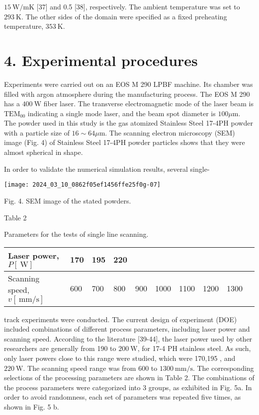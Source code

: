\documentclass[10pt]{article}
\begin{document}
$15 \mathrm{~W} / \mathrm{mK}$ [37] and 0.5 [38], respectively. The ambient temperature was set to $293 \mathrm{~K}$. The other sides of the domain were specified as a fixed preheating temperature, $353 \mathrm{~K}$.

\section*{4. Experimental procedures}
Experiments were carried out on an EOS M 290 LPBF machine. Its chamber was filled with argon atmosphere during the manufacturing process. The EOS M 290 has a $400 \mathrm{~W}$ fiber laser. The transverse electromagnetic mode of the laser beam is $\mathrm{TEM}_{00}$ indicating a single mode laser, and the beam spot diameter is $100 \mu \mathrm{m}$. The powder used in this study is the gas atomized Stainless Steel 17-4PH powder with a particle size of $16 \sim 64 \mu \mathrm{m}$. The scanning electron microscopy (SEM) image (Fig. 4) of Stainless Steel 17-4PH powder particles shows that they were almost spherical in shape.

In order to validate the numerical simulation results, several single-

\begin{center}
\texttt{[image: 2024\_03\_10\_0862f05ef1456ffe25f0g-07]}
\end{center}

Fig. 4. SEM image of the stated powders.

Table 2

Parameters for the tests of single line scanning.

\begin{center}
\begin{tabular}{llllllllll}
\hline
Laser power, $P[\mathrm{~W}]$ & 170 & 195 & 220 &  &  &  &  &  \\
\hline
Scanning speed, $v[\mathrm{~mm} / \mathrm{s}]$ & 600 & 700 & 800 & 900 & 1000 & 1100 & 1200 & 1300 \\
\hline
\end{tabular}
\end{center}

track experiments were conducted. The current design of experiment (DOE) included combinations of different process parameters, including laser power and scanning speed. According to the literature [39-44], the laser power used by other researchers are generally from 190 to $200 \mathrm{~W}$, for 17-4 PH stainless steel. As such, only laser powers close to this range were studied, which were 170,195 , and $220 \mathrm{~W}$. The scanning speed range was from 600 to $1300 \mathrm{~mm} / \mathrm{s}$. The corresponding selections of the processing parameters are shown in Table 2. The combinations of the process parameters were categorized into 3 groups, as exhibited in Fig. 5a. In order to avoid randomness, each set of parameters was repeated five times, as shown in Fig. 5 b.
\end{document}
